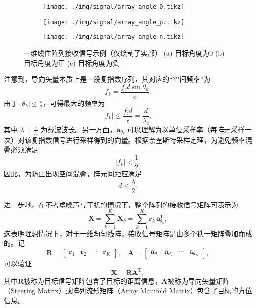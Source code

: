 \begin{figure}[htb!]
    \centering
    \begin{subfigure}{.23\textwidth}
        \centering
        \texttt{[image: ./img/signal/array\_angle\_0.tikz]}
        \caption{}
        \label{fig_array_angle_1}
    \end{subfigure}
    \begin{subfigure}{.23\textwidth}
        \centering
        \texttt{[image: ./img/signal/array\_angle\_p.tikz]}
        \caption{}
        \label{fig_array_angle_2}
    \end{subfigure}
    \begin{subfigure}{.23\textwidth}
        \centering
        \texttt{[image: ./img/signal/array\_angle\_n.tikz]}
        \caption{}
        \label{fig_array_angle_3}
    \end{subfigure}
    \caption{一维线性阵列接收信号示例（仅绘制了实部） (a) 目标角度为0 (b) 目标角度为正 (c) 目标角度为负}
    \label{fig_array_angle}
\end{figure}

注意到，导向矢量本质上是一段复指数序列，其对应的``空间频率''为
\[
    f_k = \frac{f_c d \sin\theta_k}{c}.
\]
由于 \( |\theta_k| \leq \tfrac{\pi}{2} \)，可得最大的频率为
\[
    |f_k| \leq \frac{f_c d}{c} = \frac{d}{\lambda_c},
\]
其中 \(\lambda = \tfrac{c}{f_c}\) 为载波波长。另一方面，\(\bm{a}_{\theta_k}\) 可以理解为以单位采样率（每阵元采样一次）对该复指数信号进行采样得到的向量。根据奈奎斯特采样定理，为避免频率混叠必须满足
\[
    |f_k| < \frac{1}{2}.
\]
因此，为防止出现空间混叠，阵元间距应满足
\[
    d \leq \frac{\lambda}{2}.
\]


进一步地，在不考虑噪声与干扰的情况下，整个阵列的接收信号矩阵可表示为
\[
    \mathbf{X}
    = \sum_{k=1}^{K} \mathbf{X}_k
    = \sum_{k=1}^{K} \bm{r}_k \, \bm{a}_{\theta_k}^{\mathrm{T}},
\]
这表明理想情况下，对于一维均匀线阵，接收信号矩阵是由多个秩一矩阵叠加而成的。记
\[
    \mathbf{R} = \begin{bmatrix}
        \bm{r}_1 & \bm{r}_2 & \cdots & \bm{r}_K
    \end{bmatrix}, \quad \mathbf{A} = \begin{bmatrix}
        \bm{a}_{\theta_1} & \bm{a}_{\theta_2} & \cdots & \bm{a}_{\theta_K}
    \end{bmatrix},
\]
可以验证
\[
    \mathbf{X} = \mathbf{R} \mathbf{A}^{\mathrm{T}},
\]
其中\( \mathbf{R} \)被称为目标信号矩阵包含了目标的距离信息，\( \mathbf{A} \)被称为导向矢量矩阵（Steering Matrix）或阵列流形矩阵（Array Manifold Matrix）包含了目标的方位信息。

